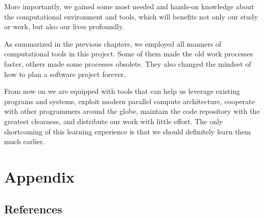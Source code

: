 \documentclass[12pt]{cls}
\begin{document}
More importantly, we gained some most needed and hands-on knowledge about the computational environment and tools, which will benefits not only our study or work, but also our lives profoundly.

As summarized in the previous chapters, we employed all manners of computational tools in this project. Some of them made the old work processes faster, others made some processes obsolete. They also changed the mindset of how to plan a software project forever.

From now on we are equipped with tools that can help us leverage existing programs and systems, exploit modern parallel compute architecture, cooperate with other programmers around the globe, maintain the code repository with the greatest clearness, and distribute our work with little effort. The only shortcoming of this learning experience is that we should definitely learn them much earlier.

\chapter{Appendix}
\section{References}
\end{document}
